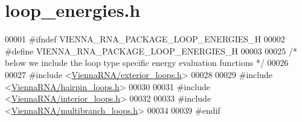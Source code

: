 \hypertarget{loop__energies_8h_source}{\section{loop\+\_\+energies.\+h}
\label{loop__energies_8h_source}
}

\begin{DoxyCode}
00001 \textcolor{preprocessor}{#ifndef VIENNA\_RNA\_PACKAGE\_LOOP\_ENERGIES\_H}
00002 \textcolor{preprocessor}{#define VIENNA\_RNA\_PACKAGE\_LOOP\_ENERGIES\_H}
00003 
00025 \textcolor{comment}{/* below we include the loop type specific energy evaluation functions */}
00026 
00027 \textcolor{preprocessor}{#include <\hyperlink{exterior__loops_8h}{ViennaRNA/exterior\_loops.h}>}
00028 
00029 \textcolor{preprocessor}{#include <\hyperlink{hairpin__loops_8h}{ViennaRNA/hairpin\_loops.h}>}
00030 
00031 \textcolor{preprocessor}{#include <\hyperlink{interior__loops_8h}{ViennaRNA/interior\_loops.h}>}
00032 
00033 \textcolor{preprocessor}{#include <\hyperlink{multibranch__loops_8h}{ViennaRNA/multibranch\_loops.h}>}
00034 
00039 \textcolor{preprocessor}{#endif}
\end{DoxyCode}
